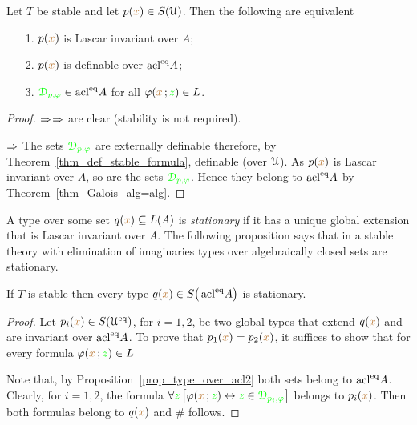 \documentclass[creche.tex]{subfiles}
\begin{document}
\begin{proposition}\label{prop_type_over_acl2} Let $T$ be stable and let $p({\color{brown} x})\in S(\EuScript U)$. Then the following are equivalent
\begin{itemize}
\item[1.] $p({\color{brown} x})$ is Lascar invariant over $A$;
\item[2.] $p({\color{brown} x})$ is definable over $\mathop{\rm acl}^{{\rm eq}}\!A$;
\item[3.] ${\color{green}\EuScript D_{p,\varphi}}\in \mathop{\rm acl}^{{\rm eq}}\!A$ for all $\varphi({\color{brown} x}\,;{\color{green} z})\in L$.
\end{itemize}
\end{proposition}
\begin{proof}
 $\Rightarrow$$\Rightarrow$ are clear (stability is not required).
 
 $\Rightarrow$ The sets ${\color{green}\EuScript D_{p,\varphi}}$ are externally definable therefore, by Theorem~\ref{thm_def_stable_formula}, definable (over $\EuScript U$). As $p({\color{brown} x})$ is Lascar invariant over $A$, so are the sets ${\color{green}\EuScript D_{p,\varphi}}$. Hence they belong to $\mathop{\rm acl}^{{\rm eq}}\!A$ by Theorem~\ref{thm_Galois_alg=alg}.
\end{proof}
% 





A type over some set $q({\color{brown} x})\subseteq L(A)$ is \emph{stationary\/} if it has a unique global extension that is Lascar invariant over $A$. The following proposition says that in a stable theory with elimination of imaginaries types over algebraically closed sets are stationary.

\begin{proposition}\label{prop_type_over_acl_stationary} If $T$ is stable then every type $q({\color{brown} x})\in S\big(\mathop{\rm acl}^{{\rm eq}}\!A\big)$ is stationary.
\end{proposition}

\begin{proof}
Let $p_i({\color{brown} x})\in S(\EuScript U^{{\rm eq}})$, for $i=1,2$, be two global types that extend $q({\color{brown} x})$ and are invariant over $\mathop{\rm acl}^{{\rm eq}}\!A$. To prove that $p_1({\color{brown} x}) =p_2({\color{brown} x})$, it suffices to show that for every formula $\varphi({\color{brown} x}\,;{\color{green} z})\in L$


Note that, by Proposition~\ref{prop_type_over_acl2} both sets belong to  $\mathop{\rm acl}^{{\rm eq}}\!A$. Clearly, for $i=1,2$, the formula $\forall{\color{green}z}\,\big[\varphi({\color{brown} x}\,;{\color{green} z})\leftrightarrow {\color{green}z}\in {\color{green}\EuScript D_{p_i,\varphi}}\big]$ belongs to $p_i({\color{brown} x})$. Then both formulas belong to $q({\color{brown} x})$ and $\#$ follows.
\end{proof}
\end{document}
